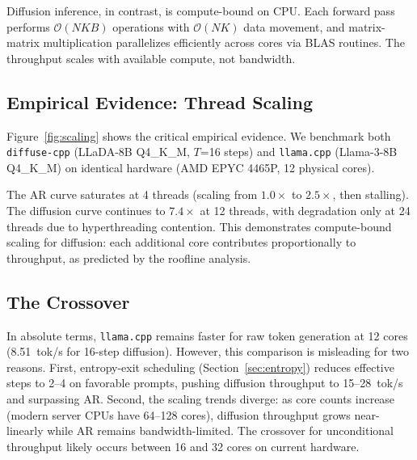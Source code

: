 \documentclass[11pt]{article}
\begin{document}
Diffusion inference, in contrast, is compute-bound on CPU. Each forward pass performs
$\mathcal{O}(NKB)$ operations with $\mathcal{O}(NK)$ data movement, and matrix-matrix
multiplication parallelizes efficiently across cores via BLAS routines. The throughput
scales with available compute, not bandwidth.

\subsection{Empirical Evidence: Thread Scaling}

Figure~\ref{fig:scaling} shows the critical empirical evidence. We benchmark both
\texttt{diffuse-cpp} (LLaDA-8B Q4\_K\_M, $T$=16 steps) and \texttt{llama.cpp}
(Llama-3-8B Q4\_K\_M) on identical hardware (AMD EPYC 4465P, 12 physical cores).


The AR curve saturates at 4 threads (scaling from $1.0\times$ to $2.5\times$, then
stalling). The diffusion curve continues to $7.4\times$ at 12 threads, with degradation
only at 24 threads due to hyperthreading contention. This demonstrates compute-bound
scaling for diffusion: each additional core contributes proportionally to throughput,
as predicted by the roofline analysis.

\subsection{The Crossover}

In absolute terms, \texttt{llama.cpp} remains faster for raw token generation at 12
cores (8.51~tok/s for 16-step diffusion). However, this comparison is misleading for
two reasons. First, entropy-exit scheduling (Section~\ref{sec:entropy}) reduces effective
steps to 2--4 on favorable prompts, pushing diffusion throughput to 15--28~tok/s and
surpassing AR. Second, the scaling trends diverge: as core counts increase (modern
server CPUs have 64--128 cores), diffusion throughput grows near-linearly while AR
remains bandwidth-limited. The crossover for unconditional throughput likely occurs
between 16 and 32 cores on current hardware.
\end{document}
